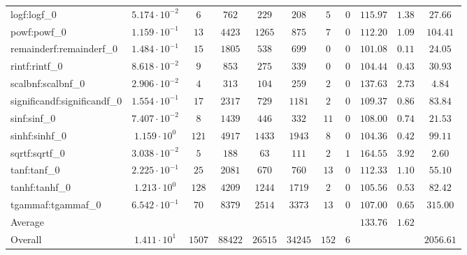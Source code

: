 \begin{tabular}{|l|c|c|c|c|c|c|c|c|c|c|}
logf:logf\_0                 & $ 5.174 \cdot 10^{-2} $ & $ 6      $ & $ 762   $ & $ 229   $ & $ 208   $ & $ 5   $ & $ 0 $ & $ 115.97      $ & $ 1.38    $ & $ 27.66   $ \\
powf:powf\_0                 & $ 1.159 \cdot 10^{-1} $ & $ 13     $ & $ 4423  $ & $ 1265  $ & $ 875   $ & $ 7   $ & $ 0 $ & $ 112.20      $ & $ 1.09    $ & $ 104.41  $ \\
remainderf:remainderf\_0     & $ 1.484 \cdot 10^{-1} $ & $ 15     $ & $ 1805  $ & $ 538   $ & $ 699   $ & $ 0   $ & $ 0 $ & $ 101.08      $ & $ 0.11    $ & $ 24.05   $ \\
rintf:rintf\_0               & $ 8.618 \cdot 10^{-2} $ & $ 9      $ & $ 853   $ & $ 275   $ & $ 339   $ & $ 0   $ & $ 0 $ & $ 104.44      $ & $ 0.43    $ & $ 30.93   $ \\
scalbnf:scalbnf\_0           & $ 2.906 \cdot 10^{-2} $ & $ 4      $ & $ 313   $ & $ 104   $ & $ 259   $ & $ 2   $ & $ 0 $ & $ 137.63      $ & $ 2.73    $ & $ 4.84    $ \\
significandf:significandf\_0 & $ 1.554 \cdot 10^{-1} $ & $ 17     $ & $ 2317  $ & $ 729   $ & $ 1181  $ & $ 2   $ & $ 0 $ & $ 109.37      $ & $ 0.86    $ & $ 83.84   $ \\
sinf:sinf\_0                 & $ 7.407 \cdot 10^{-2} $ & $ 8      $ & $ 1439  $ & $ 446   $ & $ 332   $ & $ 11  $ & $ 0 $ & $ 108.00      $ & $ 0.74    $ & $ 21.53   $ \\
sinhf:sinhf\_0               & $ 1.159 \cdot 10^{0}  $ & $ 121    $ & $ 4917  $ & $ 1433  $ & $ 1943  $ & $ 8   $ & $ 0 $ & $ 104.36      $ & $ 0.42    $ & $ 99.11   $ \\
sqrtf:sqrtf\_0               & $ 3.038 \cdot 10^{-2} $ & $ 5      $ & $ 188   $ & $ 63    $ & $ 111   $ & $ 2   $ & $ 1 $ & $ 164.55      $ & $ 3.92    $ & $ 2.60    $ \\
tanf:tanf\_0                 & $ 2.225 \cdot 10^{-1} $ & $ 25     $ & $ 2081  $ & $ 670   $ & $ 760   $ & $ 13  $ & $ 0 $ & $ 112.33      $ & $ 1.10    $ & $ 55.10   $ \\
tanhf:tanhf\_0               & $ 1.213 \cdot 10^{0}  $ & $ 128    $ & $ 4209  $ & $ 1244  $ & $ 1719  $ & $ 2   $ & $ 0 $ & $ 105.56      $ & $ 0.53    $ & $ 82.42   $ \\
tgammaf:tgammaf\_0           & $ 6.542 \cdot 10^{-1} $ & $ 70     $ & $ 8379  $ & $ 2514  $ & $ 3373  $ & $ 13  $ & $ 0 $ & $ 107.00      $ & $ 0.65    $ & $ 315.00  $ \\
\hline
Average                      & $                     $ & $        $ & $       $ & $       $ & $       $ & $     $ & $   $ & $ 133.76      $ & $ 1.62    $ & $         $ \\
\hline
Overall                      & $ 1.411 \cdot 10^{1}  $ & $ 1507   $ & $ 88422 $ & $ 26515 $ & $ 34245 $ & $ 152 $ & $ 6 $ & $             $ & $         $ & $ 2056.61 $ \\
\hline
\end{tabular}
